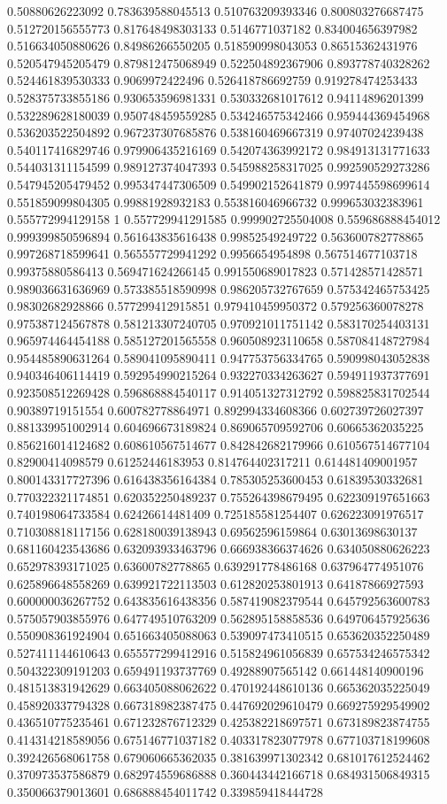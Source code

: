 \begin{table}
\begin{tabu}
\begin{sparkline}{10}
0.50880626223092 0.783639588045513 0.510763209393346 0.800803276687475 0.512720156555773 0.817648498303133 0.5146771037182 0.834004656397982 0.516634050880626 0.84986266550205 0.518590998043053 0.86515362431976 0.520547945205479 0.879812475068949 0.522504892367906 0.893778740328262 0.524461839530333 0.9069972422496 0.526418786692759 0.919278474253433 0.528375733855186 0.930653596981331 0.530332681017612 0.94114896201399 0.532289628180039 0.950748459559285 0.534246575342466 0.959444369454968 0.536203522504892 0.967237307685876 0.538160469667319 0.97407024239438 0.540117416829746 0.979906435216169 0.542074363992172 0.984913131771633 0.544031311154599 0.989127374047393 0.545988258317025 0.992590529273286 0.547945205479452 0.995347447306509 0.549902152641879 0.997445598699614 0.551859099804305 0.99881928932183 0.553816046966732 0.999653032383961 0.555772994129158 1 0.557729941291585 0.999902725504008 0.559686888454012 0.999399850596894 0.561643835616438 0.99852549249722 0.563600782778865 0.997268718599641 0.565557729941292 0.9956654954898 0.567514677103718 0.99375880586413 0.569471624266145 0.991550689017823 0.571428571428571 0.989036631636969 0.573385518590998 0.986205732767659 0.575342465753425 0.98302682928866 0.577299412915851 0.979410459950372 0.579256360078278 0.975387124567878 0.581213307240705 0.970921011751142 0.583170254403131 0.965974464454188 0.585127201565558 0.960508923110658 0.587084148727984 0.954485890631264 0.589041095890411 0.947753756334765 0.590998043052838 0.940346406114419 0.592954990215264 0.932270334263627 0.594911937377691 0.923508512269428 0.596868884540117 0.914051327312792 0.598825831702544 0.90389719151554 0.600782778864971 0.892994334608366 0.602739726027397 0.881339951002914 0.604696673189824 0.869065709592706 0.60665362035225 0.856216014124682 0.608610567514677 0.842842682179966 0.610567514677104 0.82900414098579 0.61252446183953 0.814764402317211 0.614481409001957 0.800143317727396 0.616438356164384 0.785305253600453 0.61839530332681 0.770322321174851 0.620352250489237 0.755264398679495 0.622309197651663 0.740198064733584 0.62426614481409 0.725185581254407 0.626223091976517 0.710308818117156 0.628180039138943 0.69562596159864 0.63013698630137 0.681160423543686 0.632093933463796 0.666938366374626 0.634050880626223 0.652978393171025 0.63600782778865 0.639291778486168 0.637964774951076 0.625896648558269 0.639921722113503 0.612820253801913 0.64187866927593 0.600000036267752 0.643835616438356 0.587419082379544 0.645792563600783 0.575057903855976 0.647749510763209 0.562895158858536 0.649706457925636 0.550908361924904 0.651663405088063 0.539097473410515 0.653620352250489 0.527411144610643 0.655577299412916 0.515824961056839 0.657534246575342 0.504322309191203 0.659491193737769 0.49288907565142 0.661448140900196 0.481513831942629 0.663405088062622 0.470192448610136 0.665362035225049 0.458920337794328 0.667318982387475 0.447692029610479 0.669275929549902 0.436510775235461 0.671232876712329 0.425382218697571 0.673189823874755 0.414314218589056 0.675146771037182 0.403317823077978 0.677103718199608 0.392426568061758 0.679060665362035 0.381639971302342 0.681017612524462 0.370973537586879 0.682974559686888 0.360443442166718 0.684931506849315 0.350066379013601 0.686888454011742 0.339859418444728 
\end{sparkline}
\end{tabu}
\end{table}
